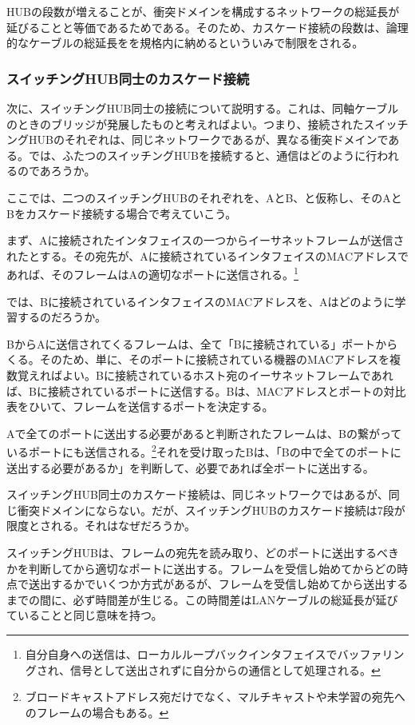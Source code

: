 HUBの段数が増えることが、衝突ドメインを構成するネットワークの総延長が延びることと等価であるためである。そのため、カスケード接続の段数は、論理的なケーブルの総延長をを規格内に納めるといういみで制限をされる。

\subsubsection{スイッチングHUB同士のカスケード接続}

次に、スイッチングHUB同士の接続について説明する。これは、同軸ケーブルのときのブリッジが発展したものと考えればよい。つまり、接続されたスイッチングHUBのそれぞれは、同じネットワークであるが、異なる衝突ドメインである。では、ふたつのスイッチングHUBを接続すると、通信はどのように行われるのであろうか。

ここでは、二つのスイッチングHUBのそれぞれを、AとB、と仮称し、そのAとBをカスケード接続する場合で考えていこう。

まず、Aに接続されたインタフェイスの一つからイーサネットフレームが送信されたとする。その宛先が、Aに接続されているインタフェイスのMACアドレスであれば、そのフレームはAの適切なポートに送信される。\footnote{自分自身への送信は、ローカルループバックインタフェイスでバッファリングされ、信号として送出されずに自分からの通信として処理される。}

では、Bに接続されているインタフェイスのMACアドレスを、Aはどのように学習するのだろうか。

BからAに送信されてくるフレームは、全て「Bに接続されている」ポートからくる。そのため、単に、そのポートに接続されている機器のMACアドレスを複数覚えればよい。Bに接続されているホスト宛のイーサネットフレームであれば、Bに接続されているポートに送信する。Bは、MACアドレスとポートの対比表をひいて、フレームを送信するポートを決定する。

Aで全てのポートに送出する必要があると判断されたフレームは、Bの繋がっているポートにも送信される。\footnote{ブロードキャストアドレス宛だけでなく、マルチキャストや未学習の宛先へのフレームの場合もある。}それを受け取ったBは、「Bの中で全てのポートに送出する必要があるか」を判断して、必要であれば全ポートに送出する。

スイッチングHUB同士のカスケード接続は、同じネットワークではあるが、同じ衝突ドメインにならない。だが、スイッチングHUBのカスケード接続は7段が限度とされる。それはなぜだろうか。

スイッチングHUBは、フレームの宛先を読み取り、どのポートに送出するべきかを判断してから適切なポートに送出する。フレームを受信し始めてからどの時点で送出するかでいくつか方式があるが、フレームを受信し始めてから送出するまでの間に、必ず時間差が生じる。この時間差はLANケーブルの総延長が延びていることと同じ意味を持つ。

